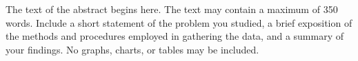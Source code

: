 \curriculumvitae
{



}

\thesisabstract
{
	The text of the abstract begins here. The text may contain a maximum of 350 words. Include a short statement of the 
problem you studied, a brief exposition of the methods and procedures employed in gathering the data, and a summary of your 
findings. No graphs, charts, or tables may be included.
}




\preliminarypages
